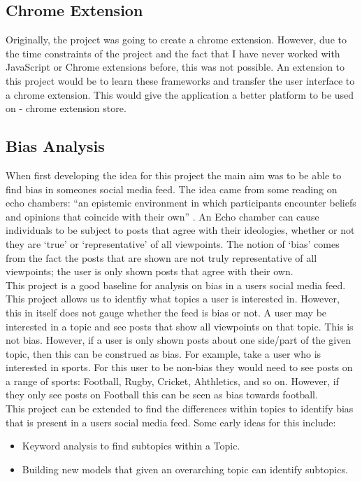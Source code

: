 \subsection{Chrome Extension}
Originally, the project was going to create a chrome extension. However, due to the time constraints of the project and the fact that I have never worked
with JavaScript or Chrome extensions before, this was not possible. An extension to this project would be to learn these frameworks and transfer the
user interface to a chrome extension. This would give the application a better platform to be used on - chrome extension store.
\subsection{Bias Analysis}
When first developing the idea for this project the main aim was to be able to find bias in someones social media feed. The idea came from some reading
on echo chambers: ``an epistemic environment in which participants encounter beliefs and opinions that coincide with their own'' \cite{echo-chambers}.
An Echo chamber can cause individuals to be subject to posts that agree with their ideologies, whether or not they are `true' or `representative' of all viewpoints.
The notion of `bias' comes from the fact the posts that are shown are not truly representative of all viewpoints; the user is only shown posts that agree with their own.\\
This project is a good baseline for analysis on bias in a users social media feed. This project allows us to identfiy what topics a user is interested in. However, this
in itself does not gauge whether the feed is bias or not. A user may be interested in a topic and see posts that show all viewpoints on that topic. This is not bias.
However, if a user is only shown posts about one side/part of the given topic, then this can be construed as bias. For example, take a user who is interested in sports.
For this user to be non-bias they would need to see posts on a range of sports: Football, Rugby, Cricket, Ahthletics, and so on. However, if they only see posts on Football
this can be seen as bias towards football.\\
This project can be extended to find the differences within topics to identify bias that is present in a users social media feed. Some early ideas for this include:
\begin{itemize}
    \item Keyword analysis to find subtopics within a Topic.
    \item Building new models that given an overarching topic can identify subtopics.
\end{itemize}